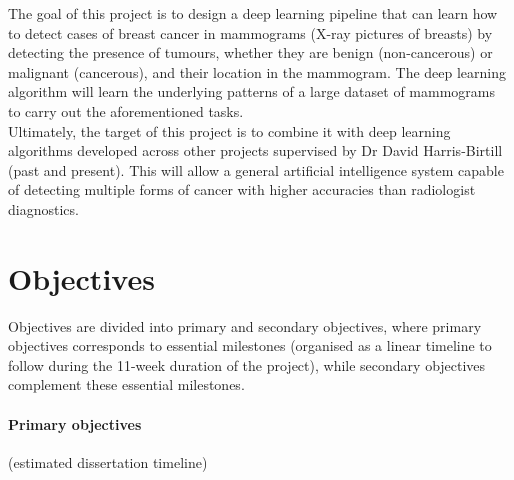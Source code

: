 \documentclass[letterpaper,12pt]{article}
\begin{document}
The goal of this project is to design a deep learning pipeline that can learn how to detect cases of breast cancer in mammograms (X-ray pictures of breasts) by detecting the presence of tumours, whether they are benign (non-cancerous) or malignant (cancerous), and their location in the mammogram. The deep learning algorithm will learn the underlying patterns of a large dataset of mammograms to carry out the aforementioned tasks.\\

Ultimately, the target of this project is to combine it with deep learning algorithms developed across other projects supervised by Dr David Harris-Birtill (past and present). This will allow a general artificial intelligence system capable of detecting multiple forms of cancer with higher accuracies than radiologist diagnostics.


\section{Objectives}
\label{sec:objectives}

Objectives are divided into primary and secondary objectives, where primary objectives corresponds to essential milestones (organised as a linear timeline to follow during the 11-week duration of the project), while secondary objectives complement these essential milestones.

\paragraph{Primary objectives}  (estimated dissertation timeline)
\end{document}
